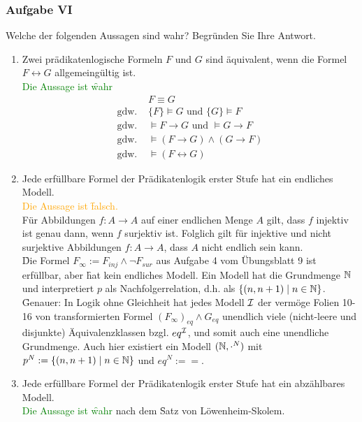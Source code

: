 \subsubsection*{Aufgabe VI}
    Welche der folgenden Aussagen sind wahr? Begründen Sie Ihre Antwort.
    \begin{enumerate}
        \item Zwei prädikatenlogische Formeln $F$ und $G$ sind äquivalent, wenn die Formel $F \leftrightarrow G$ allgemeingültig ist. \\
        \LOES \textcolor{green}{Die Aussage ist \f{wahr}} \\
        \begin{align*}
            & F \equiv G \\
            \text{gdw. }& \{F\} \models G \text{ und } \{G\} \models F \\
            \text{gdw. }& \models F \to G \text{ und } \models G \to F \\
            \text{gdw. }& \models (F \to G) \land (G \to F) \\
            \text{gdw. }& \models (F \leftrightarrow G)
        \end{align*}

        \item Jede erfüllbare Formel der Prädikatenlogik erster Stufe hat ein endliches Modell. \\
        \LOES \textcolor{orange}{Die Aussage ist \f{falsch.}} \\
        Für Abbildungen $f: A \to A$ auf einer endlichen Menge $A$ gilt, dass $f$ injektiv ist genau dann, wenn $f$ surjektiv ist. Folglich gilt für injektive und nicht surjektive Abbildungen $f: A \to A$, dass $A$ nicht endlich sein kann. \\
        \f{Die Formel} $F_{\infty} := F_{inj} \land \lnot F_{sur}$ aus Aufgabe 4 vom Übungsblatt 9 ist erfüllbar, aber \f{hat kein endliches Modell}. Ein Modell hat die Grundmenge $\mathbb{N}$ und interpretiert $p$ als Nachfolgerrelation, d.h. als $\{(n, n+1) \mid n \in \mathbb{N} \}$. \\
        \f{Genauer:} In Logik ohne Gleichheit hat jedes Modell $\mathcal{I}$ der vermöge Folien 10-16 von  transformierten Formel $(F_{\infty})_{eq} \land G_{eq}$ unendlich viele (nicht-leere und disjunkte) Äquivalenzklassen bzgl. $eq^{\mathcal{I}}$, und somit auch eine unendliche Grundmenge. Auch hier existiert ein Modell $(\mathbb{N}, \cdot^N)$ mit $p^N := \{(n,n+1) \mid n \in \mathbb{N}\}$ und $eq^N := =$.

        \item Jede erfüllbare Formel der Prädikatenlogik erster Stufe hat ein abzählbares Modell. \\
        \LOES \textcolor{green}{Die Aussage ist \f{wahr}} nach dem \f{Satz von Löwenheim-Skolem.}


\end{enumerate}
